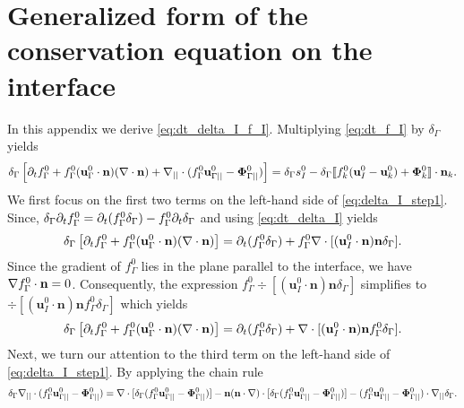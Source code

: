 \section{Generalized form of the conservation equation on the interface}
\label{ap:interface_proof}
In this appendix we derive \ref{eq:dt_delta_I_f_I}. Multiplying \ref{eq:dt_f_I} by $\delta_\Gamma$ yields
\begin{equation}
    \delta_\Gamma
    \left[ \partial_t f_\Gamma^0 
    + f_\Gamma^0 (\textbf{u}_\Gamma^0\cdot \textbf{n})  (\mathbf{\nabla}\cdot \textbf{n})
    +\mathbf{\nabla}_{||}\cdot
    (f_\Gamma^0 \textbf{u}_{\Gamma||}^0
    - \mathbf{\Phi}_{\Gamma||}^0 )
    \right]
    = \delta_\Gamma s_I^0
    - \delta_\Gamma\llbracket 
    f_k^0 (\textbf{u}_I^0 - \textbf{u}_k^0)
    + \mathbf{\Phi}_k^0 \rrbracket \cdot \textbf{n}_k.
    \label{eq:delta_I_step1}
\end{equation}
We first focus on the first two terms on the left-hand side of \ref{eq:delta_I_step1}. Since, $\delta_\Gamma\partial_t f_\Gamma^0 = \partial_t (f_\Gamma^0\delta_\Gamma) - f_\Gamma^0\partial_t\delta_\Gamma$ and using \ref{eq:dt_delta_I} yields
\begin{equation}
\delta_\Gamma
    \left[ \partial_t f_\Gamma^0 
    + f_\Gamma^0 (\textbf{u}_\Gamma^0\cdot \textbf{n})  (\mathbf{\nabla}\cdot \textbf{n}) \right] = \partial_t (f_\Gamma^0\delta_\Gamma) + f_\Gamma^0\mathbf{\nabla}\cdot [(\textbf{u}_I^0\cdot \textbf{n}) \textbf{n}\delta_\Gamma ].
\end{equation}
Since the gradient of $f_\Gamma^0$ lies in the plane parallel to the interface, we have  $\mathbf{\nabla} f_\Gamma^0 \cdot \textbf{n} = 0$. Consequently, the expression $f_\Gamma^0\div [(\textbf{u}_I^0\cdot \textbf{n}) \textbf{n}\delta_\Gamma ]$ simplifies to $\div [(\textbf{u}_I^0\cdot \textbf{n}) \textbf{n}f_\Gamma^0\delta_\Gamma ]$ which yields 
\begin{equation}
\delta_\Gamma
    \left[ \partial_t f_\Gamma^0 
    + f_\Gamma^0 (\textbf{u}_\Gamma^0\cdot \textbf{n})  (\mathbf{\nabla}\cdot \textbf{n}) \right] = \partial_t (f_\Gamma^0\delta_\Gamma) + \mathbf{\nabla}\cdot [(\textbf{u}_I^0\cdot \textbf{n}) \textbf{n}f_\Gamma^0\delta_\Gamma ].
\label{eq:delta_I_step1_2}
\end{equation}
Next, we turn our attention to the third term on the left-hand side of \ref{eq:delta_I_step1}. By applying the chain rule
\begin{equation}
    \delta_\Gamma \divI (f_\Gamma^0 \textbf{u}_{\Gamma||}^0
    - \mathbf{\Phi}_{\Gamma||}^0 ) %
    = 
    \div [\delta_\Gamma (f_\Gamma^0 \textbf{u}_{\Gamma||}^0
    - \mathbf{\Phi}_{\Gamma||}^0 )]
    - \textbf{n}(\textbf{n}\cdot\grad)\cdot [\delta_\Gamma (f_\Gamma^0 \textbf{u}_{\Gamma||}^0
    - \mathbf{\Phi}_{\Gamma||}^0 )]
    - (f_\Gamma^0 \textbf{u}_{\Gamma||}^0
    - \mathbf{\Phi}_{\Gamma||}^0 )\cdot\gradI\delta_\Gamma.
\label{eq:delta_I_step2}
\end{equation}
